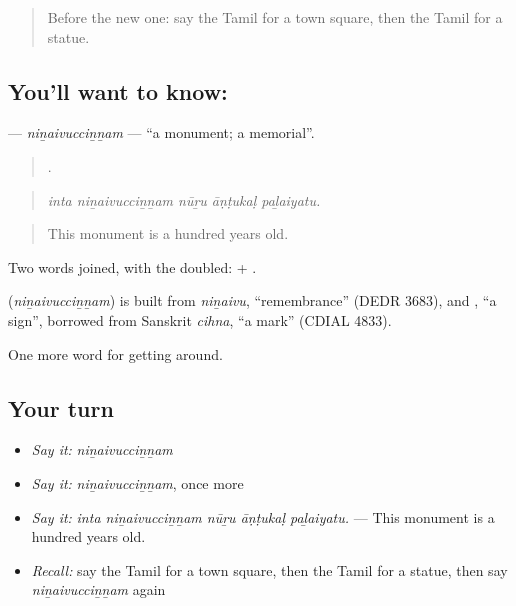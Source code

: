 \label{lesson:TA-C424-ninaivuccinnam}



\begin{quote}
Before the new one: say the Tamil for a town square, then the Tamil for a statue.
\end{quote}

\subsection*{You'll want to know: }
\textbf{} — \emph{niṉaivucciṉṉam} — \textquotedblleft{}a monument; a memorial\textquotedblright{}.

\begin{quote}
    .
\end{quote}

\begin{quote}
\emph{inta niṉaivucciṉṉam nūṟu āṇṭukaḷ paḻaiyatu.}
\end{quote}

\begin{quote}
This monument is a hundred years old.
\end{quote}

Two words joined, with the  doubled:  + .

\begin{cousinweb}
\textbf{} (\emph{niṉaivucciṉṉam}) is built from \emph{niṉaivu}, \textquotedblleft{}remembrance\textquotedblright{} (DEDR 3683), and , \textquotedblleft{}a sign\textquotedblright{}, borrowed from Sanskrit \emph{cihna}, \textquotedblleft{}a mark\textquotedblright{} (CDIAL 4833).
\end{cousinweb}

\begin{grammarlens}[title={What you've built}]
One more word for getting around.
\end{grammarlens}

\subsection*{Your turn}
\begin{itemize}
\raggedright
  \item \emph{Say it:} \emph{niṉaivucciṉṉam}
  \item \emph{Say it:} \emph{niṉaivucciṉṉam}, once more
  \item \emph{Say it:} \emph{inta niṉaivucciṉṉam nūṟu āṇṭukaḷ paḻaiyatu.} — This monument is a hundred years old.
  \item \emph{Recall:} say the Tamil for a town square, then the Tamil for a statue, then say \emph{niṉaivucciṉṉam} again
\end{itemize}

